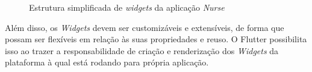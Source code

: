 \begin{figure}[ht!]
    	
  \centering
            \qquad
    \caption[Estrutura simplificada de \textit{widgets} da aplicação \textit{Nurse}]{Estrutura simplificada de \textit{widgets} da aplicação \textit{Nurse}}
  
  \label{fig:nurse-widget-tree}
\end{figure}
  
Além disso, os \textit{Widgets} devem ser customizáveis e extensíveis, de forma que possam ser flexíveis em relação às suas propriedades e reuso. O Flutter possibilita isso ao trazer a responsabilidade de criação e renderização dos \textit{Widgets} da plataforma à qual está rodando para própria aplicação.


